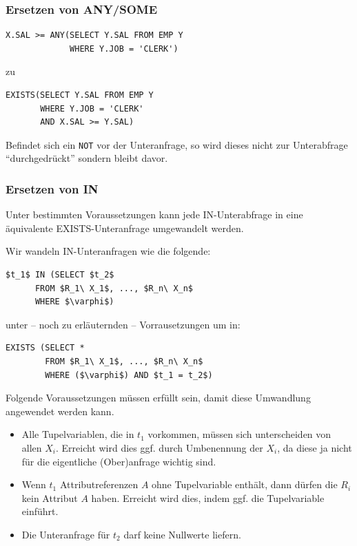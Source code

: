\subsubsection*{Ersetzen von ANY/SOME}

\begin{verbatim}
X.SAL >= ANY(SELECT Y.SAL FROM EMP Y 
             WHERE Y.JOB = 'CLERK')
\end{verbatim} zu
\begin{verbatim}
EXISTS(SELECT Y.SAL FROM EMP Y 
       WHERE Y.JOB = 'CLERK' 
       AND X.SAL >= Y.SAL)
\end{verbatim}

Befindet sich ein \verb|NOT| vor der Unteranfrage, so wird dieses nicht zur Unterabfrage ``durchgedrückt'' sondern bleibt davor.

\subsubsection{Ersetzen von IN}

Unter bestimmten Voraussetzungen kann jede IN-Unterabfrage in eine äquivalente EXISTS-Unteranfrage umgewandelt werden.

Wir wandeln IN-Unteranfragen wie die folgende:

\begin{lstlisting}[mathescape]
$t_1$ IN (SELECT $t_2$
      FROM $R_1\ X_1$, ..., $R_n\ X_n$
      WHERE $\varphi$)
\end{lstlisting}

unter -- noch zu erläuternden -- Vorrausetzungen um in:

\begin{lstlisting}[mathescape]
EXISTS (SELECT *
        FROM $R_1\ X_1$, ..., $R_n\ X_n$
        WHERE ($\varphi$) AND $t_1 = t_2$)
\end{lstlisting}

Folgende Voraussetzungen müssen erfüllt sein, damit diese Umwandlung angewendet werden kann.

\begin{itemize}
\item Alle Tupelvariablen, die in $t_1$ vorkommen, müssen sich unterscheiden von allen $X_i$. Erreicht wird dies ggf. durch Umbenennung der $X_i$, da diese ja nicht für die eigentliche (Ober)anfrage wichtig sind.
\item Wenn $t_1$ Attributreferenzen $A$ ohne Tupelvariable enthält, dann dürfen die $R_i$ kein Attribut $A$ haben. Erreicht wird dies, indem ggf. die Tupelvariable einführt.
\item Die Unteranfrage für $t_2$ darf keine Nullwerte liefern.
\end{itemize}

